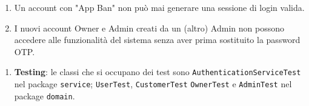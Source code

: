 \documentclass{article}
\begin{document}
	{
		\begin{enumerate}[nosep, leftmargin=*]
			\item[•] Un account con "App Ban" non può mai generare una sessione di login valida.
			\item[•] I nuovi account Owner e Admin creati da un (altro) Admin non possono accedere alle funzionalità del sistema senza aver prima sostituito la password OTP.
		\end{enumerate}
		
		\begin{enumerate}[leftmargin=*]
			\item[•] \textbf{Testing}: le classi che si occupano dei test sono \texttt{AuthenticationServiceTest} nel package \texttt{service}; \texttt{UserTest}, \texttt{CustomerTest} \texttt{OwnerTest} e \texttt{AdminTest} nel package \texttt{domain}.
		\end{enumerate}
	}
	
	\newpage
	
\end{document}
